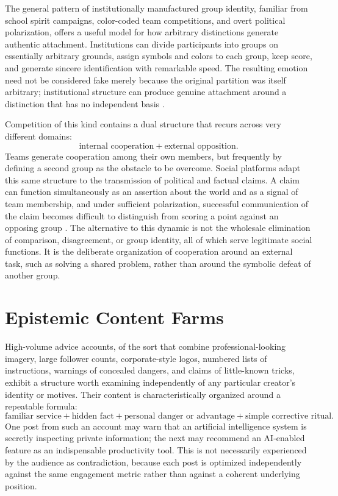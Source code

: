 \documentclass[11pt]{article}
\begin{document}
The general pattern of institutionally manufactured group identity, familiar from school spirit campaigns, color-coded team competitions, and overt political polarization, offers a useful model for how arbitrary distinctions generate authentic attachment. Institutions can divide participants into groups on essentially arbitrary grounds, assign symbols and colors to each group, keep score, and generate sincere identification with remarkable speed. The resulting emotion need not be considered fake merely because the original partition was itself arbitrary; institutional structure can produce genuine attachment around a distinction that has no independent basis \cite{tajfel1971categorization}.

Competition of this kind contains a dual structure that recurs across very different domains:
\[
\text{internal cooperation} + \text{external opposition}.
\]
Teams generate cooperation among their own members, but frequently by defining a second group as the obstacle to be overcome. Social platforms adapt this same structure to the transmission of political and factual claims. A claim can function simultaneously as an assertion about the world and as a signal of team membership, and under sufficient polarization, successful communication of the claim becomes difficult to distinguish from scoring a point against an opposing group \cite{rathje2021outgroup}. The alternative to this dynamic is not the wholesale elimination of comparison, disagreement, or group identity, all of which serve legitimate social functions. It is the deliberate organization of cooperation around an external task, such as solving a shared problem, rather than around the symbolic defeat of another group.

\section{Epistemic Content Farms}

High-volume advice accounts, of the sort that combine professional-looking imagery, large follower counts, corporate-style logos, numbered lists of instructions, warnings of concealed dangers, and claims of little-known tricks, exhibit a structure worth examining independently of any particular creator's identity or motives. Their content is characteristically organized around a repeatable formula:
\[
\text{familiar service} + \text{hidden fact} + \text{personal danger or advantage} + \text{simple corrective ritual}.
\]
One post from such an account may warn that an artificial intelligence system is secretly inspecting private information; the next may recommend an AI-enabled feature as an indispensable productivity tool. This is not necessarily experienced by the audience as contradiction, because each post is optimized independently against the same engagement metric rather than against a coherent underlying position.
\end{document}
